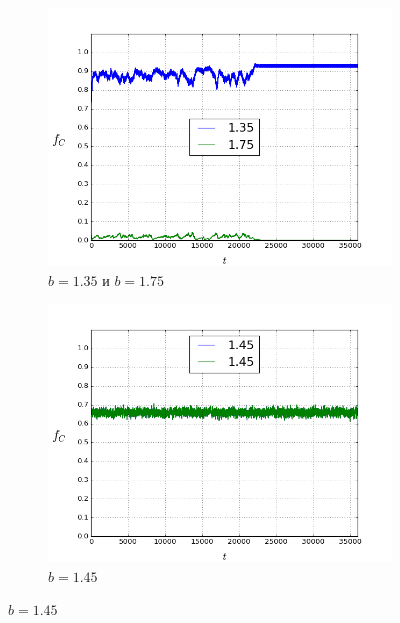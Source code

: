 \documentclass[a4paper]{article}
\begin{document}
\begin{figure}
	\begin{subfigure}{.5\textwidth}
		\includegraphics[width=.8\linewidth]{135-175.png}
		\caption{$b=1.35$ и $b=1.75$}
	\end{subfigure}
	\begin{subfigure}{.5\textwidth}
		\includegraphics[width=.8\linewidth]{145-145.png}
		\caption{$b=1.45$}
	\end{subfigure}%
	

\end{figure}
\end{document}
